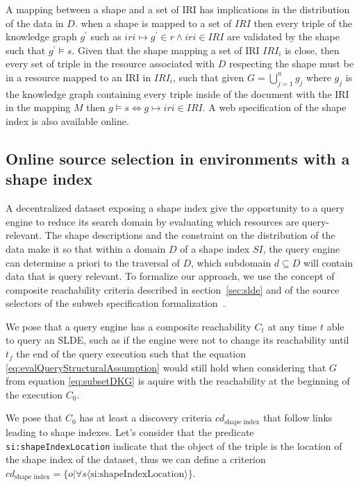 A mapping between a shape and a set of IRI has implications in the distribution of the data in $D$.
when a shape is mapped to a set of $IRI$ then every triple of the knowledge graph $g^{\prime}$ such as $iri \mapsto g^{\prime} \in r \land iri \in IRI$
are validated by the shape such that $g^{\prime} \models s$.
Given that the shape mapping a set of IRI $IRI_i$ is close, then every set of triple in the resource associated with $D$ respecting the shape must be in a resource mapped to an IRI in $IRI_i$, 
such that given $G = \bigcup\limits_{j=1}^{n} g_j$ where $g_j$ is the knowledge graph containing every triple inside of the document with the IRI in the mapping $M$
then $g \models s \iff g \mapsto iri \in IRI$.
A web specification of the shape index is also available online.~

\subsection{Online source selection in environments with a shape index}

A decentralized dataset exposing a shape index give the opportunity to a query engine to reduce its search domain by evaluating which resources are query-relevant.
The shape descriptions and the constraint on the distribution of the data make it so that within a domain $D$ of a shape index $SI$, the query engine can
determine a priori to the traversal of $D$, which subdomain $d \subseteq D$ will contain data that is query relevant.
To formalize our approach, we use the concept of composite reachability criteria described in section~\ref{sec:slde} and of the source selectors of the subweb specification formalization~\cite{Bogaerts2021LinkTW, Taelman2023}.

We pose that a query engine has a composite reachability $C_t$ at any time $t$ able to query an SLDE, such as if the engine were not to change its reachability
until $t_f$ the end of the query execution such that the equation \ref{eq:evalQueryStructuralAssumption} would still hold when considering that $G$ from equation \ref{eq:subsetDKG} is aquire with the reachability 
at the beginning of the execution $C_{0}$.


We pose that $C_0$ has at least a discovery criteria $cd_{\text{shape index}}$ that follow links leading to shape indexes.
Let's consider that the predicate \texttt{si:shapeIndexLocation} indicate that the object of the triple is the location of the shape index 
of the dataset, thus we can define a criterion $cd_{\text{shape index}} = \{o|\forall s \langle \text{si:shapeIndexLocation} \rangle \}$.

